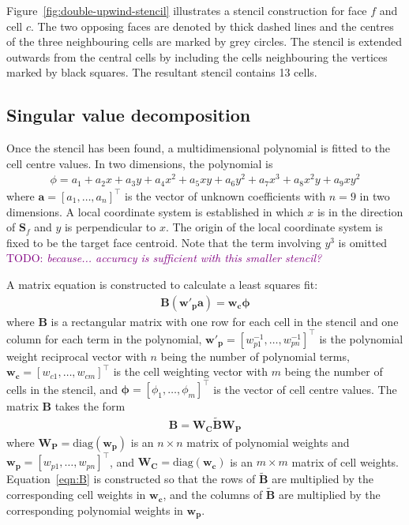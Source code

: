\documentclass{article}
\newcommand{\TODO}[1]{\textcolor{purple}{TODO: \emph{#1}}}
\begin{document}
Figure~\ref{fig:double-upwind-stencil} illustrates a stencil construction for face $f$ and cell $c$.  The two opposing faces are denoted by thick dashed lines and the centres of the three neighbouring cells are marked by grey circles.  The stencil is extended outwards from the central cells by including the cells neighbouring the vertices marked by black squares.  The resultant stencil contains 13 cells.

\subsection{Singular value decomposition}
Once the stencil has been found, a multidimensional polynomial is fitted to the cell centre values.
In two dimensions, the polynomial is
\begin{align}
	\phi = a_1 + a_2 x + a_3 y + a_4 x^2 + a_5 xy + a_6 y^2 + a_7 x^3 + a_8 x^2 y + a_9 x y^2
\end{align}
where $\mathbf{a} = [a_1, \ldots, a_n]^\intercal$ is the vector of unknown coefficients with $n=9$ in two dimensions.  A local coordinate system is established in which $x$ is in the direction of $\mathbf{S}_f$ and $y$ is perpendicular to $x$.
The origin of the local coordinate system is fixed to be the target face centroid.
Note that the term involving $y^3$ is omitted \TODO{because... accuracy is sufficient with this smaller stencil?}

A matrix equation is constructed to calculate a least squares fit:
\begin{align}
	\mathbf{B} \left(\mathbf{w'_p} \mathbf{a}\right) = \mathbf{w_c} \bm{\phi}
\end{align}
where $\mathbf{B}$ is a rectangular matrix with one row for each cell in the stencil and one column for each term in the polynomial, $\mathbf{w'_p} = [w_{p1}^{-1}, \ldots, w_{pn}^{-1}]^\intercal$ is the polynomial weight reciprocal vector with $n$ being the number of polynomial terms,  $\mathbf{w_c} = [w_{c1}, \ldots, w_{cm}]^\intercal$ is the cell weighting vector with $m$ being the number of cells in the stencil, and $\bm{\phi} = [\phi_1, \ldots, \phi_m]^\intercal$ is the vector of cell centre values.
The matrix $\mathbf{B}$ takes the form
\begin{align}
	\mathbf{B} = \mathbf{W_C} \mathbf{\tilde{B}} \mathbf{W_P} \label{eqn:B}
\end{align}
where $\mathbf{W_P} = \mathrm{diag}(\mathbf{w_p})$ is an $n \times n$ matrix of polynomial weights and $\mathbf{w_p} = [w_{p1}, \ldots, w_{pn}]^\intercal$, and $\mathbf{W_C} = \mathrm{diag}(\mathbf{w_c})$ is an $m \times m$ matrix of cell weights.  Equation~\ref{eqn:B} is constructed so that the rows of $\mathbf{\tilde{B}}$ are multiplied by the corresponding cell weights in $\mathbf{w_c}$, and the columns of $\mathbf{\tilde{B}}$ are multiplied by the corresponding polynomial weights in $\mathbf{w_p}$.
\end{document}
